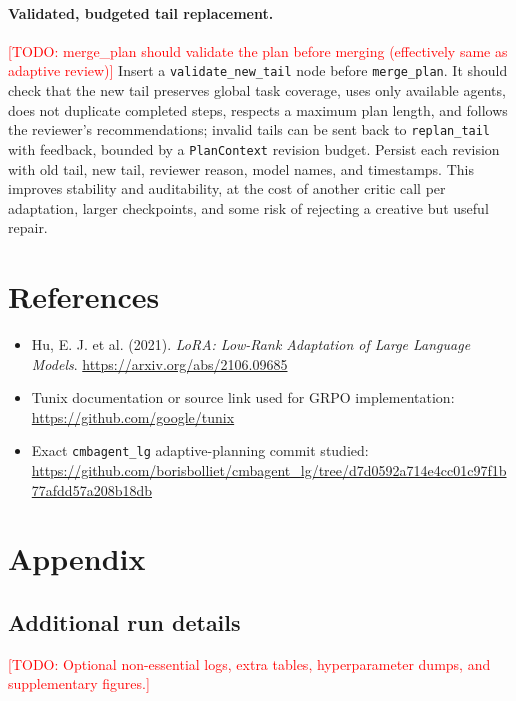 \documentclass[11pt,a4paper]{article}
\newcommand{\code}[1]{\texttt{#1}}
\newcommand{\TODO}[1]{\textcolor{red}{[TODO: #1]}}
\begin{document}
\paragraph{Validated, budgeted tail replacement.}
\TODO{merge\_plan should validate the plan before merging (effectively same as adaptive review)}
Insert a \code{validate\_new\_tail} node before \code{merge\_plan}.  It should check that the new tail preserves global task coverage, uses only available agents, does not duplicate completed steps, respects a maximum plan length, and follows the reviewer's recommendations; invalid tails can be sent back to \code{replan\_tail} with feedback, bounded by a \code{PlanContext} revision budget.  Persist each revision with old tail, new tail, reviewer reason, model names, and timestamps.  This improves stability and auditability, at the cost of another critic call per adaptation, larger checkpoints, and some risk of rejecting a creative but useful repair.

\newpage
\section*{References}

\begin{itemize}
    \item Hu, E. J. et al. (2021). \emph{LoRA: Low-Rank Adaptation of Large Language Models}. \url{https://arxiv.org/abs/2106.09685}
    \item Tunix documentation or source link used for GRPO implementation: \url{https://github.com/google/tunix}
    \item Exact \code{cmbagent\_lg} adaptive-planning commit studied: \url{https://github.com/borisbolliet/cmbagent_lg/tree/d7d0592a714e4cc01c97f1b77afdd57a208b18db}
\end{itemize}

\appendix
\section{Appendix}

\subsection{Additional run details}
\TODO{Optional non-essential logs, extra tables, hyperparameter dumps, and supplementary figures.}
\end{document}
